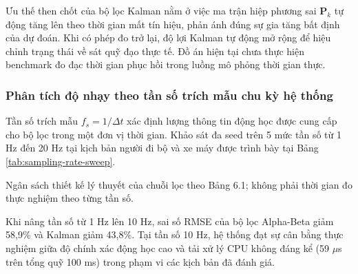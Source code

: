 Ưu thế then chốt của bộ lọc Kalman nằm ở việc ma trận hiệp phương sai $\mathbf{P}_k$ tự động tăng lên theo thời gian mất tín hiệu, phản ánh đúng sự gia tăng bất định của dự đoán. Khi có phép đo trở lại, độ lợi Kalman tự động mở rộng để hiệu chỉnh trạng thái về sát quỹ đạo thực tế. Đồ án hiện tại chưa thực hiện benchmark đo đạc thời gian phục hồi trong luồng mô phỏng thời gian thực.

\subsubsection{Phân tích độ nhạy theo tần số trích mẫu chu kỳ hệ thống}

\hspace{0.5cm} Tần số trích mẫu $f_s = 1/\Delta t$ xác định lượng thông tin động học được cung cấp cho bộ lọc trong một đơn vị thời gian. Khảo sát đa seed trên 5 mức tần số từ 1 Hz đến 20 Hz tại kịch bản người đi bộ và xe máy được trình bày tại Bảng \ref{tab:sampling-rate-sweep}.

\begin{table}[H]
\centering
\caption{Đánh giá sai số định vị RMSE theo tần số trích mẫu hệ thống $f_s$}
\label{tab:sampling-rate-sweep}
\end{table}

Ngân sách thiết kế lý thuyết của chuỗi lọc theo Bảng 6.1; không phải thời gian đo thực nghiệm theo từng tần số.

Khi nâng tần số từ 1 Hz lên 10 Hz, sai số RMSE của bộ lọc Alpha-Beta giảm 58,9\% và Kalman giảm 43,8\%. Tại tần số 10 Hz, hệ thống đạt sự cân bằng thực nghiệm giữa độ chính xác động học cao và tải xử lý CPU không đáng kể (59 $\mu$s trên tổng quỹ 100 ms) trong phạm vi các kịch bản đã đánh giá.

